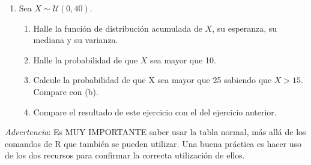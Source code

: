 \documentclass[11pt,a4paper,twoside]{article}%
\begin{document}
\begin{enumerate}
\item Sea $X\sim\mathcal{U}(0,40).$

\begin{enumerate}
\item Halle la funci\'{o}n de distribuci\'{o}n acumulada de $X$, su esperanza,
su mediana y su varianza.

\item Halle la probabilidad de que $X$ sea mayor que 10.

\item Calcule la probabilidad de que X sea mayor que 25 sabiendo que $X>15$.
Compare con (b).

\item Compare el resultado de este ejercicio con el del ejercicio anterior.
\end{enumerate}

\end{enumerate}

\noindent\emph{Advertencia}: Es MUY IMPORTANTE saber usar la tabla normal, m\'as all\'a de los comandos de R que tambi\'en se pueden utilizar. Una buena pr\'actica es hacer uso de los dos recursos para confirmar la correcta utilizaci\'on de ellos.
\end{document}
